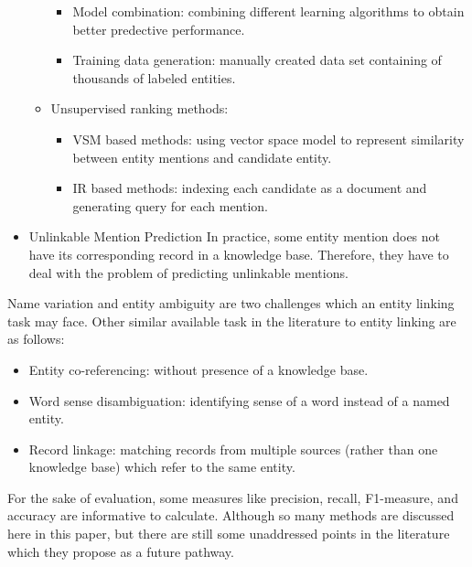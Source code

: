 \documentclass[letterpaper,12pt]{article}
\begin{document}
\begin{itemize}
\begin{itemize}
\begin{itemize}
            \item Model combination: combining different learning algorithms to obtain better predective performance.
            \item Training data generation: manually created data set containing of thousands of labeled entities.
        \end{itemize}
    \item Unsupervised ranking methods:
        \begin{itemize}
            \item VSM based methods: using vector space model to represent similarity between entity mentions and candidate entity.
            \item IR based methods: indexing each candidate as a document and generating query for each mention.
        \end{itemize}
\end{itemize}

\item Unlinkable Mention Prediction
In practice, some entity mention does not have its corresponding record in a knowledge base. Therefore, they have to deal with the problem of predicting unlinkable mentions.
\end{itemize}

Name variation and entity ambiguity are two challenges which an entity linking task may face. Other similar available task in the literature to entity linking are as follows:
\begin{itemize}
    \item Entity co-referencing: without presence of a knowledge base.
    \item Word sense disambiguation: identifying sense of a word instead of a named entity.
    \item Record linkage: matching records from multiple sources (rather than one knowledge base) which refer to the same entity.
\end{itemize}

For the sake of evaluation, some measures like precision, recall, F1-measure, and accuracy are informative to calculate.
Although so many methods are discussed here in this paper, but there are still some unaddressed points in the literature which they propose as a future pathway.
\end{document}
